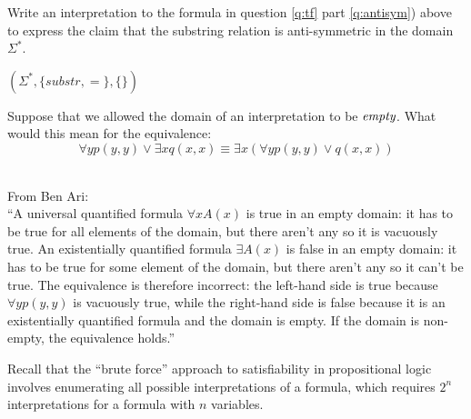 \documentclass[]{exam}
\begin{document}
\begin{questions}

\question Write an interpretation to the formula in question \ref{q:tf} part \ref{q:antisym}) 
above to express the claim that the substring relation is
anti-symmetric in the domain $\Sigma^*$.
\begin{solution}
$(\Sigma^*, \{substr, = \}, \{\})$
\end{solution}

\question Suppose that we allowed the domain of an interpretation to be
$\emph{empty}$. What would this mean for the equivalence:
\[ \forall y p(y,y) \lor \exists x q(x,x) \equiv \exists x (\forall y p (y,y) \lor q(x,x))\]
\begin{solution}
~\\
From Ben Ari:\\
``A universal quantified formula $\forall xA(x)$ is true in an empty domain: it has to be true 
for all elements of the domain, but there aren’t any so it is vacuously true. An existentially 
quantified formula $\exists A(x)$ is false in an empty domain: it has to be true for some 
element of the domain, but there aren’t any so it can’t be true. The equivalence is therefore 
incorrect: the left-hand side is true because $\forall yp(y,y)$ is vacuously true, while the 
right-hand side is false because it is an existentially quantified formula and the domain is 
empty. If the domain is non-empty, the equivalence holds.''
\end{solution}

\question Recall that the ``brute force'' approach to satisfiability in
propositional logic involves enumerating all possible interpretations of a
formula, which requires $2^n$ interpretations for a formula with $n$ variables.
\end{questions}
\end{document}
